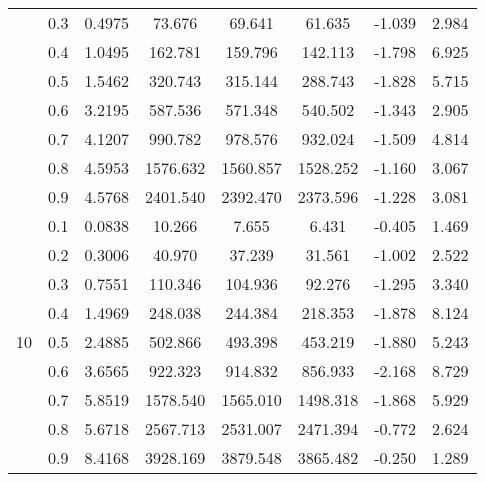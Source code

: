 \documentclass[11pt,a4paper]{report}
\begin{document}
\begin{longtable}{ | c | c || c | c | c | c | c | c | }
 & 0.3 & 0.4975 & 73.676 & 69.641 & 61.635 & -1.039 & 2.984 \\
 & 0.4 & 1.0495 & 162.781 & 159.796 & 142.113 & -1.798 & 6.925 \\
 & 0.5 & 1.5462 & 320.743 & 315.144 & 288.743 & -1.828 & 5.715 \\
 & 0.6 & 3.2195 & 587.536 & 571.348 & 540.502 & -1.343 & 2.905 \\
 & 0.7 & 4.1207 & 990.782 & 978.576 & 932.024 & -1.509 & 4.814 \\
 & 0.8 & 4.5953 & 1576.632 & 1560.857 & 1528.252 & -1.160 & 3.067 \\
 & 0.9 & 4.5768 & 2401.540 & 2392.470 & 2373.596 & -1.228 & 3.081 \\
 \hline
\multirow{9}{*}{10} & 0.1 & 0.0838 & 10.266 & 7.655 & 6.431 & -0.405 & 1.469 \\
 & 0.2 & 0.3006 & 40.970 & 37.239 & 31.561 & -1.002 & 2.522 \\
 & 0.3 & 0.7551 & 110.346 & 104.936 & 92.276 & -1.295 & 3.340 \\
 & 0.4 & 1.4969 & 248.038 & 244.384 & 218.353 & -1.878 & 8.124 \\
 & 0.5 & 2.4885 & 502.866 & 493.398 & 453.219 & -1.880 & 5.243 \\
 & 0.6 & 3.6565 & 922.323 & 914.832 & 856.933 & -2.168 & 8.729 \\
 & 0.7 & 5.8519 & 1578.540 & 1565.010 & 1498.318 & -1.868 & 5.929 \\
 & 0.8 & 5.6718 & 2567.713 & 2531.007 & 2471.394 & -0.772 & 2.624 \\
 & 0.9 & 8.4168 & 3928.169 & 3879.548 & 3865.482 & -0.250 & 1.289 \\
 \hline
\hline
\end{longtable}
\end{document}
